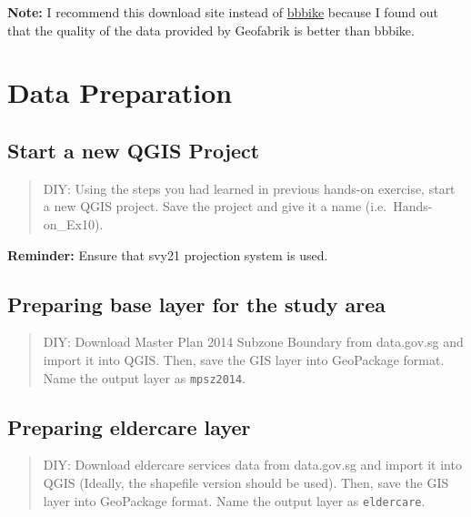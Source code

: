 \documentclass[
  letterpaper,
  DIV=11,
  numbers=noendperiod]{scrreprt}
\begin{document}
\textbf{Note:} I recommend this download site instead of
\href{https://www.bbbike.org/}{bbbike} because I found out that the
quality of the data provided by Geofabrik is better than bbbike.

\hypertarget{data-preparation-5}{%
\section{Data Preparation}\label{data-preparation-5}}

\hypertarget{start-a-new-qgis-project-1}{%
\subsection{Start a new QGIS Project}\label{start-a-new-qgis-project-1}}

\begin{quote}
DIY: Using the steps you had learned in previous hands-on exercise,
start a new QGIS project. Save the project and give it a name
(i.e.~Hands-on\_Ex10).
\end{quote}

\textbf{Reminder:} Ensure that svy21 projection system is used.

\hypertarget{preparing-base-layer-for-the-study-area}{%
\subsection{Preparing base layer for the study
area}\label{preparing-base-layer-for-the-study-area}}

\begin{quote}
DIY: Download Master Plan 2014 Subzone Boundary from data.gov.sg and
import it into QGIS. Then, save the GIS layer into GeoPackage format.
Name the output layer as \texttt{mpsz2014}.
\end{quote}

\hypertarget{preparing-eldercare-layer}{%
\subsection{Preparing eldercare layer}\label{preparing-eldercare-layer}}

\begin{quote}
DIY: Download eldercare services data from data.gov.sg and import it
into QGIS (Ideally, the shapefile version should be used). Then, save
the GIS layer into GeoPackage format. Name the output layer as
\texttt{eldercare}.
\end{quote}
\end{document}
